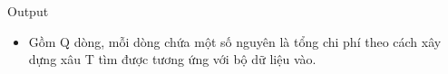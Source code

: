 Output
\begin{itemize}
	\item Gồm Q dòng, mỗi dòng chứa một số nguyên là tổng chi phí theo cách xây dựng xâu T tìm được tương ứng với bộ dữ liệu vào.
\end{itemize}
